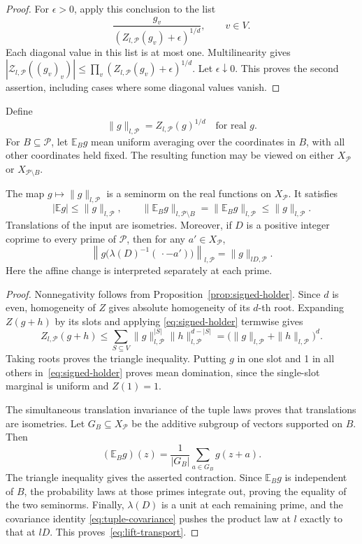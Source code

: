 \begin{proof}
For \(\epsilon>0\), apply this conclusion to the list
\[
 \frac{g_v}{(Z_{l,\mathcal P}(g_v)+\epsilon)^{1/d}},
 \qquad v\in V.
\]
Each diagonal value in this list is at most one.  Multilinearity gives
\( |\mathcal Z_{l,\mathcal P}((g_v)_v)|
 \le\prod_v(Z_{l,\mathcal P}(g_v)+\epsilon)^{1/d}\).
Let \(\epsilon\downarrow0\).  This proves the second assertion,
including cases where some diagonal values vanish.
\end{proof}

Define
\[
 \|g\|_{l,\mathcal P}=Z_{l,\mathcal P}(g)^{1/d}
 \quad\text{for real }g.
\]
For \(B\subseteq\mathcal P\), let \(\mathbb E_B g\) mean uniform averaging
over the coordinates in \(B\), with all other coordinates held fixed.
The resulting function may be viewed on either \(X_{\mathcal P}\) or
\(X_{\mathcal P\setminus B}\).

\begin{lemma}
\label{lem:seminorm}
The map \(g\mapsto\|g\|_{l,\mathcal P}\) is a seminorm on the real
functions on \(X_{\mathcal P}\).  It satisfies
\[
 |\mathbb E g|\le\|g\|_{l,\mathcal P},
 \qquad
 \|\mathbb E_Bg\|_{l,\mathcal P\setminus B}
 =\|\mathbb E_Bg\|_{l,\mathcal P}
 \le\|g\|_{l,\mathcal P}.
\]
Translations of the input are isometries.  Moreover, if \(D\) is a
positive integer coprime to every prime of \(\mathcal P\), then for
any \(a'\in X_{\mathcal P}\),
\begin{equation}
 \left\|g\bigl(\lambda(D)^{-1}(\,\cdot-a')\bigr)
       \right\|_{l,\mathcal P}
 =\|g\|_{lD,\mathcal P}.
 \label{eq:lift-transport}
\end{equation}
Here the affine change is interpreted separately at each prime.
\end{lemma}

\begin{proof}
Nonnegativity follows from Proposition~\ref{prop:signed-holder}.
Since \(d\) is even, homogeneity of \(Z\) gives absolute homogeneity
of its \(d\)-th root.  Expanding \(Z(g+h)\) by its slots and applying
\eqref{eq:signed-holder} termwise gives
\[
 Z_{l,\mathcal P}(g+h)
 \le\sum_{S\subseteq V}\|g\|_{l,\mathcal P}^{|S|}
                         \|h\|_{l,\mathcal P}^{d-|S|}
 =\bigl(\|g\|_{l,\mathcal P}+\|h\|_{l,\mathcal P}\bigr)^d.
\]
Taking roots proves the triangle inequality.
Putting \(g\) in one slot and 1 in all others in~\eqref{eq:signed-holder}
proves mean domination, since the single-slot marginal is uniform and
\(Z(1)=1\).

The simultaneous translation invariance of the tuple laws proves that
translations are isometries.  Let \(G_B\subseteq X_{\mathcal P}\)
be the additive subgroup of vectors supported on \(B\).  Then
\[
 (\mathbb E_Bg)(z)=\frac1{|G_B|}\sum_{a\in G_B}g(z+a).
\]
The triangle inequality gives the asserted contraction.  Since
\(\mathbb E_Bg\) is independent of \(B\), the probability laws at those
primes integrate out, proving the equality of the two seminorms.
Finally, \(\lambda(D)\) is a unit at each remaining prime, and
the covariance identity \eqref{eq:tuple-covariance} pushes the product law at \(l\) exactly to that at
\(lD\).  This proves~\eqref{eq:lift-transport}.
\end{proof}

